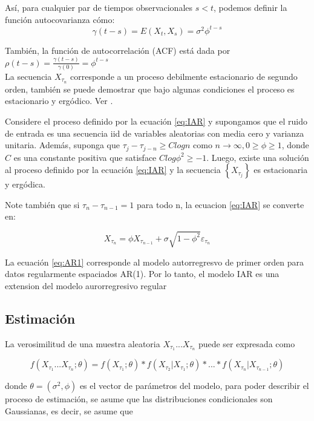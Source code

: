 Así, para cualquier par de tiempos observacionales $s < t$, podemos definir la función
autocovarianza cómo:\\

$$\gamma (t-s) = E(X_t, X_s) = \sigma^2 \phi^{t-s}$$ 

También, la función de autocorrelación (ACF) está dada por $\rho(t-s) = \frac{\gamma (t-s)}{\gamma (0)} = \phi^{t-s}$\\

La secuencia $X_{\tau_n}$ corresponde a un proceso debilmente estacionario de segundo orden,
también se puede demostrar que bajo algunas condiciones el proceso es estacionario
y ergódico. Ver \cite[]{eyheramendy2018irregular}.\\

\begin{theorem}
Considere el proceso definido por la ecuación \ref{eq:IAR} y supongamos que el ruido de entrada es una secuencia
iid de variables aleatorias con media cero y varianza unitaria. Además, suponga que $\tau_j - \tau_{j-n} \geq C log n$
como $n \to \infty, 0 \ge \phi \ge 1$, donde $C$ es una constante positiva que satisface $Clog \phi^2 \ge -1$. Luego,
existe una solución al proceso definido por la ecuación \ref{eq:IAR} y la secuencia $\left\lbrace X_{\tau_j} \right\rbrace$
es estacionaria y ergódica.
\end{theorem}


Note también que si $\tau_n - \tau_{n-1} = 1$ para todo n, la ecuacion \ref{eq:IAR} se converte en:

\begin{equation}
	X_{\tau_n} = \phi X_{\tau_{n-1}} + \sigma \sqrt{1- \phi^2 }\varepsilon_{\tau_n}
\label{eq:AR1}
\end{equation}

La ecuación \ref{eq:AR1} corresponde al modelo autorregresvo de primer orden para datos regularmente espaciados AR(1). Por lo tanto, el modelo IAR
es una extension del modelo aurorregresivo regular

\subsection{Estimación}
La verosimilitud de una muestra aleatoria ${X_{\tau_1} ... X_{\tau_n}}$ puede ser expresada como

$$f(X_{\tau_1} ... X_{\tau_n}; \theta) = f(X_{\tau_1};\theta)*f(X_{\tau_2}|X_{\tau_1};\theta) * ... * f(X_{\tau_n}|X_{\tau_{n-1}};\theta)$$ 

donde $\theta = (\sigma^2,\phi)$ es el vector de parámetros del modelo, para poder describir el proceso de estimación, se asume que 
las distribuciones condicionales son Gaussianas, es decir, se asume que 

